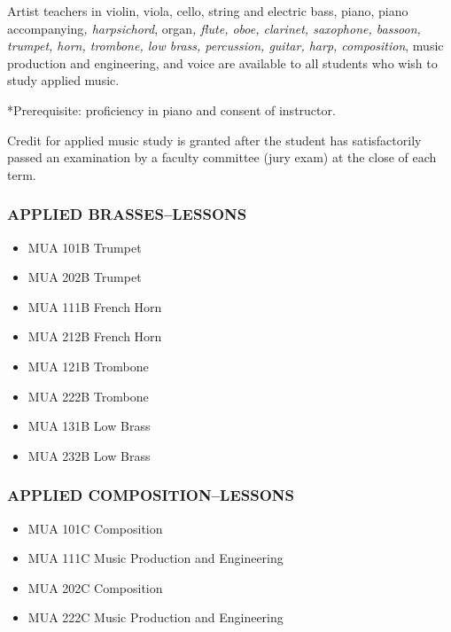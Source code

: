 \documentclass[
  letterpaper,
]{scrbook}
\providecommand{\tightlist}{%
  \setlength{\itemsep}{0pt}\setlength{\parskip}{0pt}}
\begin{document}
Artist teachers in violin, viola, cello, string and electric bass,
piano, piano accompanying\emph{, harpsichord}, organ\emph{, flute, oboe,
clarinet, saxophone, bassoon, trumpet, horn, trombone, low brass,
percussion, guitar, harp, composition}, music production and
engineering, and voice are available to all students who wish to study
applied music.

*Prerequisite: proficiency in piano and consent of instructor.

Credit for applied music study is granted after the student has
satisfactorily passed an examination by a faculty committee (jury exam)
at the close of each term.

\subsubsection{APPLIED BRASSES--LESSONS}\label{applied-brasseslessons}

\begin{itemize}
\tightlist
\item
  MUA 101B Trumpet\\
\item
  MUA 202B Trumpet\\
\item
  MUA 111B French Horn\\
\item
  MUA 212B French Horn\\
\item
  MUA 121B Trombone\\
\item
  MUA 222B Trombone\\
\item
  MUA 131B Low Brass\\
\item
  MUA 232B Low Brass
\end{itemize}

\subsubsection{APPLIED
COMPOSITION--LESSONS}\label{applied-compositionlessons}

\begin{itemize}
\tightlist
\item
  MUA 101C Composition\\
\item
  MUA 111C Music Production and Engineering\\
\item
  MUA 202C Composition\\
\item
  MUA 222C Music Production and Engineering
\end{itemize}
\end{document}
